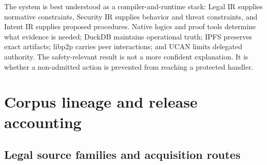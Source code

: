 \documentclass{article}
\begin{document}
The system is best understood as a compiler-and-runtime stack: Legal IR supplies normative constraints, Security IR supplies behavior and threat constraints, and Intent IR supplies proposed procedures. Native logics and proof tools determine what evidence is needed; DuckDB maintains operational truth; IPFS preserves exact artifacts; libp2p carries peer interactions; and UCAN limits delegated authority. The safety-relevant result is not a more confident explanation. It is whether a non-admitted action is prevented from reaching a protected handler.

\clearpage
\nocite{mcp,mcp-auth,catala,cvefixes,quack,ipfs,libp2p,ucan}


\clearpage
\appendix

\section{Corpus lineage and release accounting}

\subsection{Legal source families and acquisition routes}
\end{document}
